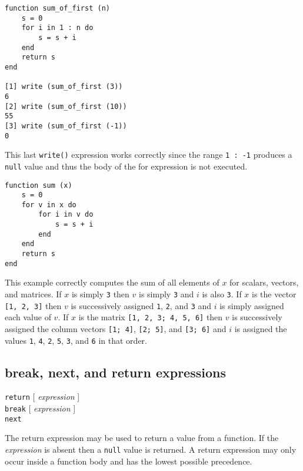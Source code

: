 \begin{screen}
\begin{verbatim}
function sum_of_first (n)
    s = 0
    for i in 1 : n do
        s = s + i
    end
    return s
end

[1] write (sum_of_first (3))
6
[2] write (sum_of_first (10))
55
[3] write (sum_of_first (-1))
0
\end{verbatim}
\end{screen}

This last {\tt write()} expression works correctly since the range
{\tt 1 :\ -1} produces a {\tt null} value and thus the body of the
{\sc for} expression is not executed.

\begin{screen}
\begin{verbatim}
function sum (x)
    s = 0
    for v in x do
        for i in v do
            s = s + i
        end
    end
    return s
end
\end{verbatim}
\end{screen}

This example correctly computes the sum of all elements of $x$ for
scalars, vectors, and matrices.  If $x$ is simply {\tt 3} then $v$ is
simply {\tt 3} and $i$ is also {\tt 3}.  If $x$ is the vector {\tt [1,
2, 3]} then $v$ is successively assigned {\tt 1}, {\tt 2}, and {\tt 3}
and $i$ is simply assigned each value of $v$.  If $x$ is the matrix
{\tt [1, 2, 3; 4, 5, 6]} then $v$ is successively assigned the
column vectors {\tt [1; 4]}, {\tt [2; 5]}, and {\tt [3; 6]} and $i$
is assigned the values {\tt 1}, {\tt 4}, {\tt 2}, {\tt 5}, {\tt 3},
and {\tt 6} in that order.


\subsection{{\sc break}, {\sc next}, and {\sc return} expressions}
\label{burlap.flow.break}

\begin{screen}
{\tt return} [ {\it expression} ] \\
{\tt break} [ {\it expression} ] \\
{\tt next} 
\end{screen}

The {\sc return} expression may be used to return a value from a
function.  If the {\it expression} is absent then a {\tt null} value
is returned.  A {\sc return} expression may only occur inside a
function body and has the lowest possible precedence.

